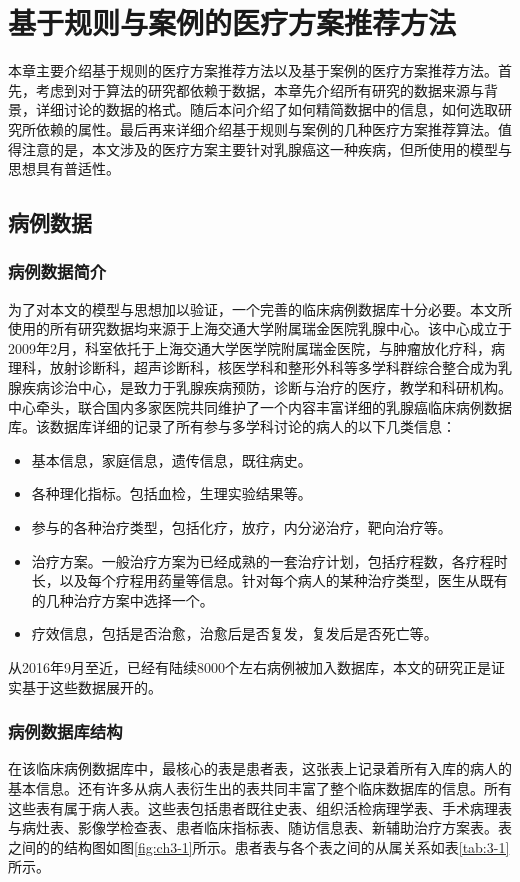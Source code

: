 \chapter{基于规则与案例的医疗方案推荐方法}

本章主要介绍基于规则的医疗方案推荐方法以及基于案例的医疗方案推荐方法。首先，考虑到对于算法的研究都依赖于数据，本章先介绍所有研究的数据来源与背景，详细讨论的数据的格式。随后本问介绍了如何精简数据中的信息，如何选取研究所依赖的属性。最后再来详细介绍基于规则与案例的几种医疗方案推荐算法。值得注意的是，本文涉及的医疗方案主要针对乳腺癌这一种疾病，但所使用的模型与思想具有普适性。

\section{病例数据}
\label{sec_3_1}
\subsection{病例数据简介}
为了对本文的模型与思想加以验证，一个完善的临床病例数据库十分必要。本文所使用的所有研究数据均来源于上海交通大学附属瑞金医院乳腺中心。该中心成立于2009年2月，科室依托于上海交通大学医学院附属瑞金医院，与肿瘤放化疗科，病理科，放射诊断科，超声诊断科，核医学科和整形外科等多学科群综合整合成为乳腺疾病诊治中心，是致力于乳腺疾病预防，诊断与治疗的医疗，教学和科研机构。中心牵头，联合国内多家医院共同维护了一个内容丰富详细的乳腺癌临床病例数据库。该数据库详细的记录了所有参与多学科讨论的病人的以下几类信息：
\begin{itemize}

\item 基本信息，家庭信息，遗传信息，既往病史。
\item 各种理化指标。包括血检，生理实验结果等。
\item 参与的各种治疗类型，包括化疗，放疗，内分泌治疗，靶向治疗等。
\item 治疗方案。一般治疗方案为已经成熟的一套治疗计划，包括疗程数，各疗程时长，以及每个疗程用药量等信息。针对每个病人的某种治疗类型，医生从既有的几种治疗方案中选择一个。
\item 疗效信息，包括是否治愈，治愈后是否复发，复发后是否死亡等。

\end{itemize}

从2016年9月至近，已经有陆续8000个左右病例被加入数据库，本文的研究正是证实基于这些数据展开的。

\subsection{病例数据库结构}
在该临床病例数据库中，最核心的表是患者表，这张表上记录着所有入库的病人的基本信息。还有许多从病人表衍生出的表共同丰富了整个临床数据库的信息。所有这些表有属于病人表。这些表包括患者既往史表、组织活检病理学表、手术病理表与病灶表、影像学检查表、患者临床指标表、随访信息表、新辅助治疗方案表。表之间的的结构图如图\ref{fig:ch3-1}所示。患者表与各个表之间的从属关系如表\ref{tab:3-1}所示。



